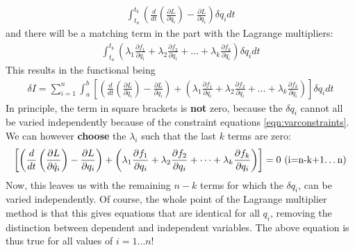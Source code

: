 \begin{align}
\int_{t_a}^{t_b}  \left(\frac{d}{dt}\left(\frac{\partial L}{\partial \dot{q}_i}\right)-\frac{\partial L}{\partial q_i}\right) \delta q_i dt
\end{align}
and there will be a matching term in the part with the Lagrange multipliers:
\begin{align}
\int_{t_a}^{t_b}  \left(\lambda_1 \frac{\partial f_1}{\partial q_i}+\lambda_2\frac{\partial f_2}{\partial q_i} +\dots +\lambda_k \frac{\partial f_k}{\partial q_i} \right) \delta q_i dt
\end{align}
This results in the functional being
\begin{align}
\delta I=\sum_{i=1}^n \int_a^b\left[ \left(\frac{d}{dt}\left(\frac{\partial L}{\partial \dot{q}_i}\right)-\frac{\partial L}{\partial q_i}\right) +\left(\lambda_1 \frac{\partial f_1}{\partial q_i}+\lambda_2\frac{\partial f_2}{\partial q_i} +\dots +\lambda_k \frac{\partial f_k}{\partial q_i} \right)\right] \delta q_i dt
\end{align}
In principle, the term in square brackets is \textbf{not} zero, because the $\delta q_i$ cannot all be varied independently because of the constraint equations \ref{eqn:varconstraints}. We can however \textbf{choose} the $\lambda_i$ such that the last $k$ terms are zero:
\begin{align}
\left[ \left(\frac{d}{dt}\left(\frac{\partial L}{\partial \dot{q}_i}\right)-\frac{\partial L}{\partial q_i}\right) +\left(\lambda_1 \frac{\partial f_1}{\partial q_i}+\lambda_2\frac{\partial f_2}{\partial q_i} +\dots +\lambda_k \frac{\partial f_k}{\partial q_i} \right)\right]=0 \text{  			(i=n-k+1\dots n)}
\label{eqn:ELLambda}
\end{align}
Now, this leaves us with the remaining $n-k$ terms for which the $\delta q_i$, can be varied independently. Of course, the whole point of the Lagrange multiplier method is that this gives equations that are identical for all $q_i$, removing the distinction between dependent and independent variables. The above equation is thus true for all values of $i=1\dots n$!

